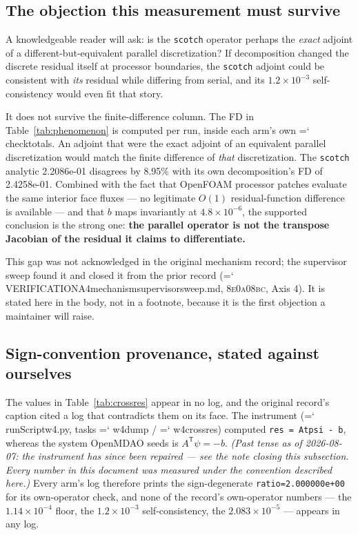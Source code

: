 \documentclass[11pt,a4paper]{article}
\newcommand{\artifact}[1]{{\small\ttfamily\hyphenchar\font=`\-\relax
  \def\_{\textunderscore\allowbreak}#1}}
\newcommand{\commit}[1]{\textsc{\small #1}}
\begin{document}
\subsection{The objection this measurement must survive}

A knowledgeable reader will ask: is the \texttt{scotch} operator perhaps the \emph{exact}
adjoint of a different-but-equivalent parallel discretization? If decomposition changed the
discrete residual itself at processor boundaries, the \texttt{scotch} adjoint could be
consistent with \emph{its} residual while differing from serial, and its
\(1.2\times10^{-3}\) self-consistency would even fit that story.

It does not survive the finite-difference column. The FD in Table~\ref{tab:phenomenon} is
computed per run, inside each arm's own \artifact{check\_totals}. An adjoint that were the
exact adjoint of an equivalent parallel discretization would match the finite difference of
\emph{that} discretization. The \texttt{scotch} analytic 2.2086e-01 disagrees by 8.95\% with
its own decomposition's FD of 2.4258e-01. Combined with the fact that OpenFOAM processor
patches evaluate the same interior face fluxes --- no legitimate \(O(1)\) residual-function
difference is available --- and that \(b\) maps invariantly at \(4.8\times10^{-6}\), the
supported conclusion is the strong one: \textbf{the parallel operator is not the transpose
Jacobian of the residual it claims to differentiate.}

This gap was not acknowledged in the original mechanism record; the supervisor sweep found
it and closed it from the prior record (\artifact{VERIFICATION\_A4\_mechanism\_supervisor\_sweep.md},
\commit{8e0a08bc}, Axis 4). It is stated here in the body, not in a footnote, because it is
the first objection a maintainer will raise.

\subsection{Sign-convention provenance, stated against ourselves}
\label{sec:signconv}

The values in Table~\ref{tab:crossres} appear in no log, and the original record's caption
cited a log that contradicts them on its face. The instrument
(\artifact{runScript\_w4.py}, tasks \artifact{w4\_dump} / \artifact{w4\_crossres}) computed
\texttt{res = Atpsi - b}, whereas the system OpenMDAO seeds is \(A^{\mathsf T}\psi = -b\).
\emph{(Past tense as of 2026-08-07: the instrument has since been repaired ---
see the note closing this subsection. Every number in this document was measured under the
convention described here.)}
Every arm's log therefore prints the sign-degenerate \texttt{ratio=2.000000e+00} for its
own-operator check, and none of the record's own-operator numbers --- the
\(1.14\times10^{-4}\) floor, the \(1.2\times10^{-3}\) self-consistency, the
\(2.083\times10^{-5}\) --- appears in any log.
\end{document}
